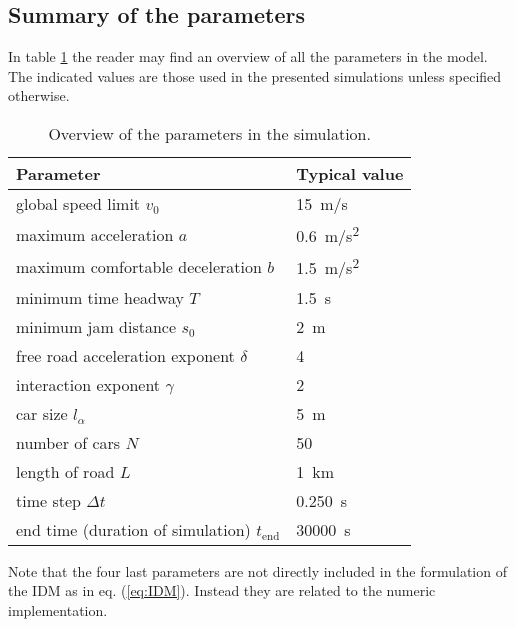 \subsection{Summary of the parameters}
In table \ref{tab:param} the reader may find an overview of all the parameters in the model. The indicated values are those used in the presented simulations unless specified otherwise.
\begin{table}
    \begin{center}
        \begin{tabular}[pos]{p{} p{}}
            \toprule
            Parameter & Typical value\\
            \midrule
            global speed limit $v_0$ & \SI{15}{m/s} \\
            maximum acceleration $a$ & \SI{0.6}{m/s^2} \\
            maximum comfortable deceleration $b$ & \SI{1.5}{m/s^2} \\
            minimum time headway $T$ & \SI{1.5}{s} \\
            minimum jam distance $s_0$ & \SI{2}{m} \\
            free road acceleration exponent $\delta$ & 4 \\
            interaction exponent $\gamma$ & 2\\
            car size $l_\alpha$ & \SI{5}{m} \\
            number of cars $N$ & 50\\
            length of road $L$ & \SI{1}{km} \\
            time step $\Delta t$ & \SI{0.250}{s} \\
            end time (duration of simulation) $t_\mathrm{end}$ &  \SI{30000}{s}\\
            \bottomrule
        \end{tabular}
    \end{center}
    \caption{Overview of the parameters in the simulation.}
    \label{tab:param}
\end{table}


Note that the four last parameters are not directly included in the formulation of the IDM as in eq. (\ref{eq:IDM}). Instead they are related to the numeric implementation.
